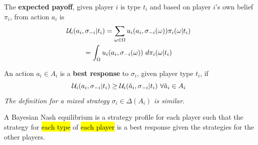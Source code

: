 \documentclass[11pt]{article}
\begin{document}
			\begin{definition}
				The \textbf{expected payoff}, given player $i$ is type $t_i$ and based on player $i$'s own belief $\pi_i$, from action $a_i$ is 
				\begin{gather}
					\mc{U}_i(a_i, \sigma_{-i}| t_i) 
					= \sum_{\omega \in \Omega} u_i(a_i, \sigma_{-i}(\omega))\pi_i(\omega|t_i) \\
					= \int_{\Omega} u_i(a_i, \sigma_{-i}(\omega))\ d\pi_i(\omega|t_i)
				\end{gather}
			\end{definition}
			
			\begin{definition}
				An action $a_i \in A_i$ is a \textbf{best response} to $\sigma_i$, given player type $t_i$, if
				\begin{equation}
					\mathcal{{U}}_i(a_i, \sigma_{-i}|t_i) \geq \mathcal{{U}}_i(\tilde{a}_i, \sigma_{-i}|t_i)\ \forall \tilde{a}_i \in A_i
				\end{equation}
				\emph{The definition for a mixed strategy $\sigma_i \in \Delta(A_i)$ is similar}.
			\end{definition}
			
			\begin{definition}
				A Bayesian Nash equilibrium is a strategy profile for each player such that the strategy for \hl{each type} of \hl{each player} is a best response given the strategies for the other players.
			\end{definition}
\end{document}
